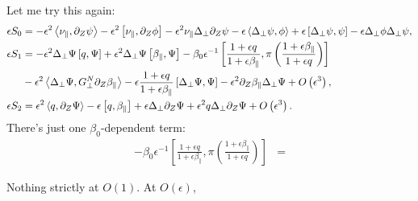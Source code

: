 \documentclass{article}
\newcommand{\para}{\parallel}
\newcommand{\ep}{\epsilon}
\newcommand{\lap}{\Delta_\perp}
\newcommand{\p}{\partial}
\newcommand{\fr}{\frac{1+\ep q}{1+\ep\beta_\para}}
\newcommand{\frinv}{\frac{1+\ep\beta_\para}{1+\ep q}}
\newcommand{\GN}{G_\perp^N}
\newcommand{\pth} [1] {\left( #1 \right) }
\newcommand{\br} [1] {\left[ #1 \right] }
\begin{document}
Let me try this again: 
\begin{align*}
    \ep S_0 &= -\ep^2\Braket{\nu_\para, \p_Z\psi} -\ep^2\br{\nu_\para, \p_Z\phi} - \ep^2\nu_\para\lap\p_Z\psi - \ep\Braket{\lap\psi, \phi} + \ep\br{\lap\psi, \psi} - \ep\lap\phi\lap\psi, \\ 
    \ep S_1 &= - \ep^2\lap\Psi\br{q,\Psi} + \ep^2\lap\Psi\br{\beta_\para,\Psi} - \beta_0\ep^{-1} \br{\fr, \pi\pth{\frinv}} \\ 
        &- \ep^2\Braket{\lap\Psi, \GN\p_Z\beta_\para} - \ep\fr \br{\lap\Psi, \Psi} - \ep^2\p_Z\beta_\para\lap\Psi + O\pth{\ep^3}, \\ 
    \ep S_2 &= \ep^2\Braket{q, \p_Z\Psi} - \ep\br{q, \beta_\para} + \ep\lap\p_Z\Psi +\ep^2q\lap\p_Z\Psi + O\pth{\ep^3}. 
\end{align*}
There's just one $\beta_0$-dependent term: 
\begin{align*}
    - \beta_0\ep^{-1} \br{\fr, \pi\pth{\frinv}} &= 
\end{align*}

Nothing strictly at $O(1)$. At $O(\ep)$, 
\end{document}
